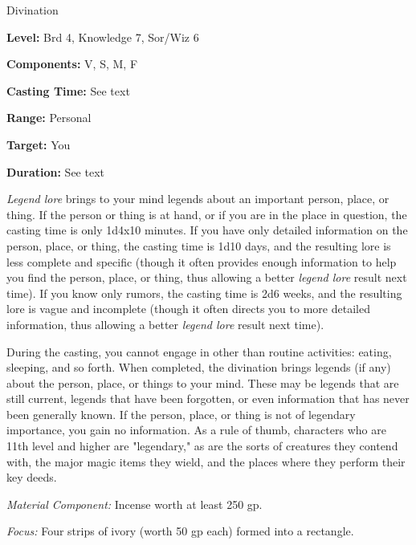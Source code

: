 
Divination

\textbf{Level:} Brd 4, Knowledge 7, Sor/Wiz 6

\textbf{Components:} V, S, M, F

\textbf{Casting Time:} See text

\textbf{Range:} Personal

\textbf{Target:} You

\textbf{Duration:} See text

\textit{Legend lore} brings to your mind legends about an important person, place, 
or thing. If the person or thing is at hand, or if you are in the place in question, 
the casting time is only 1d4x10 minutes. If you have only detailed information 
on the person, place, or thing, the casting time is 1d10 days, and the resulting 
lore is less complete and specific (though it often provides enough information 
to help you find the person, place, or thing, thus allowing a better \textit{legend 
lore} result next time). If you know only rumors, the casting time is 2d6 weeks, 
and the resulting lore is vague and incomplete (though it often directs you to 
more detailed information, thus allowing a better \textit{legend lore} result next 
time).

During the casting, you cannot engage in other than routine activities: eating, 
sleeping, and so forth. When completed, the divination brings legends (if any) 
about the person, place, or things to your mind. These may be legends that are 
still current, legends that have been forgotten, or even information that has never 
been generally known. If the person, place, or thing is not of legendary importance, 
you gain no information. As a rule of thumb, characters who are 11th level and 
higher are "legendary," as are the sorts of creatures they contend with, the 
major magic items they wield, and the places where they perform their key deeds.

\textit{Material Component:} Incense worth at least 250 gp.

\textit{Focus:} Four strips of ivory (worth 50 gp each) formed into a rectangle.

